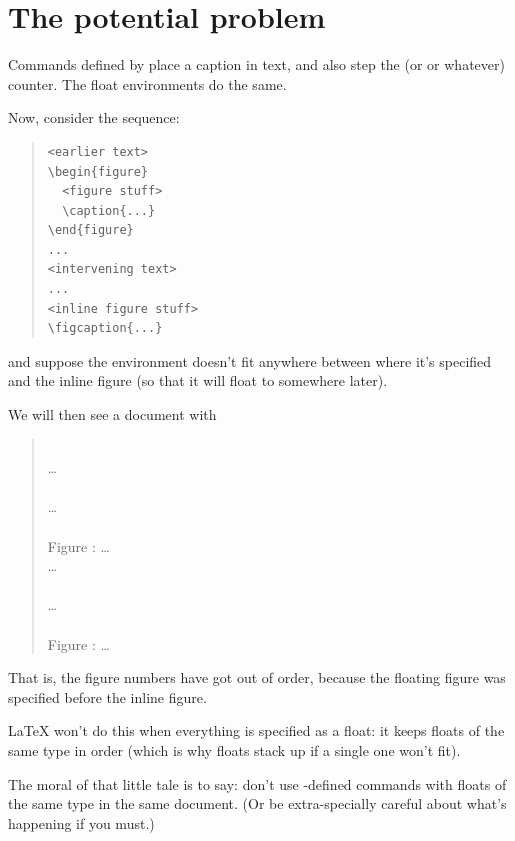 \documentclass[a4paper]{l3in2edoc}
\begin{document}
\section{The potential problem}

Commands defined by  place a caption in text, and also step the
 (or  or whatever) counter.  The float
environments do the same.

Now, consider the sequence:
\begin{quote}
\begin{verbatim}
<earlier text>
\begin{figure}
  <figure stuff>
  \caption{...}
\end{figure}
...
<intervening text>
...
<inline figure stuff>
\figcaption{...}
\end{verbatim}
\end{quote}
and suppose the  environment doesn't fit anywhere
between where it's specified and the inline figure (so that it will
float to somewhere later).

We will then see a document with
\begin{quote}
\\
\dots\\
\\
\dots\\
\\
Figure : \dots\\
\dots\\
\\
\dots\\
\\
Figure : \dots
\end{quote}
That is, the figure numbers have got out of order, because the
floating figure was specified before the inline figure.

\LaTeX{} won't do this when everything is specified as a float: it
keeps floats of the same type in order (which is why floats stack up
if a single one won't fit).

The moral of that little tale is to say: don't use
-defined commands with floats of the same type in the same
document.  (Or be extra-specially careful about what's happening if
you must.)
\end{document}
